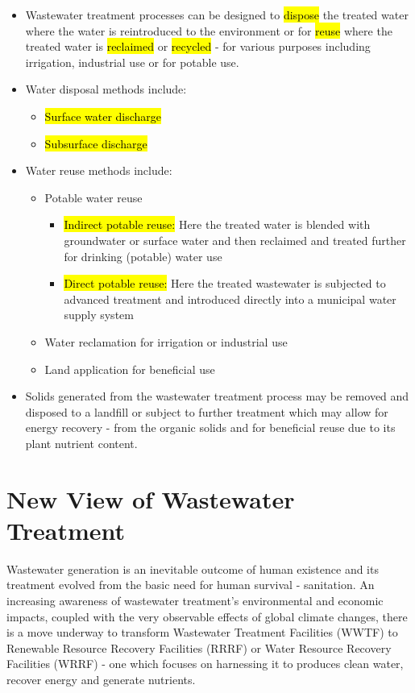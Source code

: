 \begin{itemize}
\item Wastewater treatment processes can be designed to \hl{dispose} the treated water where the water is reintroduced to the environment or for \hl{reuse} where the treated water is \hl{reclaimed} or \hl{recycled} - for various purposes including irrigation, industrial use or for potable use.
\item Water disposal methods include:\\
\begin{itemize}
\item \hl{Surface water discharge}
\item \hl{Subsurface discharge}
\end{itemize}
\item Water reuse methods include:\\
\begin{itemize}
\item Potable water reuse
\begin{itemize}
\item \hl{Indirect potable reuse:}  Here the treated water is blended with groundwater or surface water and then reclaimed and treated further 
for drinking (potable) water use
\item \hl{Direct potable reuse:}  Here the treated wastewater is subjected to advanced treatment and introduced directly into a municipal water supply system
\end{itemize}
\item Water reclamation for irrigation or industrial use\\
\item Land application for beneficial use\\
\end{itemize}
\item Solids generated from the wastewater treatment process may be removed and disposed to a landfill or subject to further treatment which may allow for energy recovery - from the organic solids and for beneficial reuse due to its plant nutrient content.\\
\end{itemize}

\section{New View of Wastewater Treatment}
Wastewater generation is an inevitable outcome of human existence and its treatment evolved from the basic need for human survival - sanitation.  An increasing awareness of wastewater treatment's environmental and economic impacts, coupled with the very observable effects of global climate changes, there is a move underway to transform Wastewater Treatment Facilities (WWTF) to Renewable Resource Recovery Facilities (RRRF) or Water Resource Recovery Facilities (WRRF) - one which focuses on harnessing it to produces clean water, recover energy and generate nutrients.  



